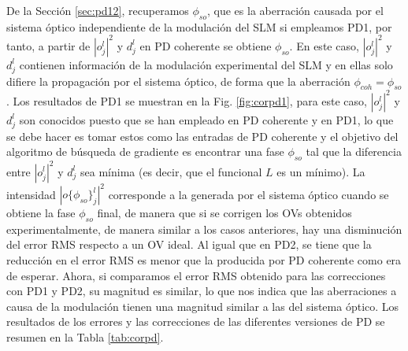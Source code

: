 
De la Sección \ref{sec:pd12}, recuperamos $\phi_{so}$, que es la aberración causada por el sistema óptico independiente de la modulación del SLM si empleamos PD1, por tanto, a partir de $|o_j^l|^2$ y $d_j^l$  en PD coherente se obtiene $\phi_{so}$. En este caso, $|o_j^l|^2$ y $d_j^l$ contienen información de la modulación experimental del SLM y en ellas solo difiere la propagación por el sistema óptico, de forma que la aberración $\phi_{coh} = \phi_{so}$. Los resultados de PD1 se muestran en la Fig. \ref{fig:corpd1}, para este caso, $|o_j^l|^2$ y $d_j^l$ son conocidos puesto que se han empleado en PD coherente y en PD1, lo que se debe hacer es tomar estos como las entradas de PD coherente y el objetivo del algoritmo de búsqueda de gradiente es encontrar una fase $\phi_{so}$ tal que la diferencia entre $|o_j^l|^2$ y $d_j^l$ sea mínima (es decir, que el funcional $L$ es un mínimo). La intensidad $|o\{\phi_{so}\}_j^l|^2$ corresponde a la generada por el sistema óptico cuando se obtiene la fase $\phi_{so}$ final, de manera que si se corrigen los OVs obtenidos experimentalmente, de manera similar a los casos anteriores, hay una disminución del error RMS respecto a un OV ideal. Al igual que en PD2, se tiene que la reducción en el error RMS es menor que la producida por PD coherente como era de esperar. Ahora, si comparamos el error RMS obtenido para las correcciones con PD1 y PD2, su magnitud es similar, lo que nos indica que las aberraciones a causa de la modulación tienen una magnitud similar a las del sistema óptico. Los resultados de los errores y las correcciones de las diferentes versiones de PD se resumen en la Tabla \ref{tab:corpd}.\\

